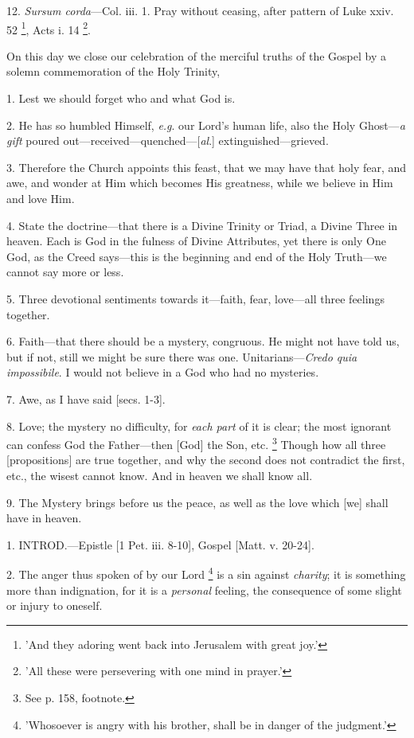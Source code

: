 12. \emph{Sursum corda}—Col. iii. 1. Pray
without ceasing, after pattern of Luke xxiv. 52 \footnote{'And they adoring went
back into Jerusalem with great joy.'}, Acts i. 14 \footnote{'All these were
persevering with one mind in prayer.'}.


On this day we close our celebration of the
merciful truths of the Gospel by a solemn commemoration of the Holy
Trinity,

1. Lest we should forget who and what God is.

2. He has so humbled Himself, \emph{e.g}. our
Lord's human life, also the Holy Ghost—\emph{a gift} poured
out—received—quenched—[\emph{al}.] extinguished—grieved.

3. Therefore the Church appoints this feast, that
we may have that holy fear, and awe, and wonder at Him which
becomes His greatness, while we believe in Him and love Him.

4. State the doctrine—that there is a Divine
Trinity or Triad, a Divine Three in heaven. Each is God in the fulness
of Divine Attributes, yet there is only One God, as the Creed
says—this is the beginning and end of the Holy Truth—we cannot say
more or less.

5. Three devotional sentiments towards
it—faith, fear, love—all three feelings together.

6. Faith—that there should be a mystery,
congruous. He might not have told us, but if not, still we might be
sure there was one. Unitarians—\emph{Credo quia impossibile}. I
would not believe in a God who had no mysteries.

7. Awe, as I have said [secs. 1-3].

8. Love; the mystery no difficulty, for \emph{each
part} of it is clear; the most ignorant can confess God the
Father—then [God] the Son, etc. \footnote{See p. 158, footnote.} Though how all three [propositions] are true together, and why
the second does not contradict the first, etc., the wisest cannot
know. And in heaven we shall know all.

9. The Mystery brings before us the peace, as
well as the love which [we] shall have in heaven.


1. INTROD.—Epistle
[1 Pet. iii. 8-10], Gospel [Matt. v. 20-24].

2. The anger thus spoken of by our Lord \footnote{'Whosoever is angry with
his brother, shall be in danger of the judgment.'} is a sin against \emph{charity}; it is something more than
indignation, for it is a \emph{personal} feeling, the consequence of
some slight or injury to oneself.

